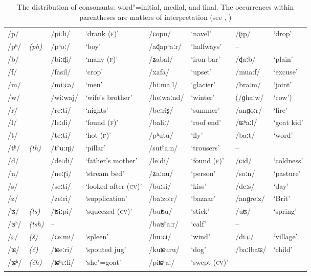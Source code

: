 \begin{sidewaystable}[p!]
\caption{The distribution of consonants: word"=initial, medial, and final.{\protect\footnotemark}
  The occurrences within parentheses are matters of interpretation (see ,
  )}
\begin{tabularx}{\textwidth}{ l@{\hspace{20pt}} l@{\hspace{20pt}} Q l@{\hspace{20pt}} Q Q Q Q }
\lsptoprule
/p/ &
&
/piːli/ &
`drank (\textsc{f})' &
/ɕopu/ &
`navel' &
/ʈip/ &
`drop'\\
/pʰ/ &
\textit{(ph)} &
/pʰoː/ &
`boy' &
/aɖapʰaːr/ &
`halfways' &
-- &
\\
/b/ &
&
/biːɖi/ &
`many (\textsc{f})' &
/ʑabal/ &
`iron bar' &
/ɖaːb/ &
`plain'\\
/f/ &
&
/fasil/ &
`crop' &
/xafa/ &
`upset' &
/muaːf/ &
`excuse'\\
/m/ &
&
/miːɕa/ &
`men' &
/hiːmaːl/ &
`glacier' &
/braːm/ &
`joint'\\
/w/ &
&
/wiːwaj/ &
`wife's brother' &
/heːwaːnd/ &
`winter' &
(/ɡhaːw/ &
`cow')\\
/r/ &
&
/reːti/ &
`nights' &
/beːriʂ/ &
`summer' &
/anɡoːr/ &
`fire'\\
/l/ &
&
/leːdi/ &
`found (\textsc{f})' &
/baliː/ &
`roof end' &
/ʨʰaːl/ &
`goat kid'\\
/t/ &
&
/teːti/ &
`hot (\textsc{f})' &
/pʰutu/ &
`fly' &
/baːt/ &
`word'\\
/tʰ/ &
\textit{(th)} &
/tʰuːɳi/ &
`pillar' &
/sutʰaːn/ &
`trousers' &
-- &
\\
/d/ &
&
/deːdi/ &
`father's mother' &
/leːdi/ &
`found (\textsc{f})' &
/ɕid/ &
`coldness'\\
/n/ &
&
/neːɽi/ &
`stream bed' &
/ʑaːnu/ &
`person' &
/soːn/ &
`pasture'\\
/s/ &
&
/seːti/ &
`looked after (\textsc{cv})' &
/buːsi/ &
`kiss' &
/deːs/ &
`day'\\
/z/ &
&
/zeːri/ &
`supplication' &
/baːzoːr/ &
`bazaar' &
/anɡreːz/ &
`Brit'\\
/ʦ/ &
\textit{(ts)} &
/ʦiːpi/ &
`squeezed (\textsc{cv})' &
/buʦu/ &
`stick' &
/uʦ/ &
`spring'\\
/ʦʰ/ &
\textit{(tsh)} &
-- &
&
/baʦʰaːr/ &
`calf' &
-- &
\\
/ɕ/ &
\textit{(š)} &
/ɕeːmi/ &
`spleen' &
/huːɕi/ &
`wind' &
/diːɕ/ &
`village'\\
/ʨ/ &
\textit{(č)} &
/ʨeːri/ &
`spouted jug' &
/kuʨuru/ &
`dog' &
/baːlbaʨ/ &
`child'\\
/ʨʰ/ &
\textit{(čh)} &
/ʨʰeːli/ &
`she"=goat' &
/piʨʰaː/ &
`swept  (\textsc{cv})' &
-- &
\\\lspbottomrule
\end{tabularx}
\end{sidewaystable}

